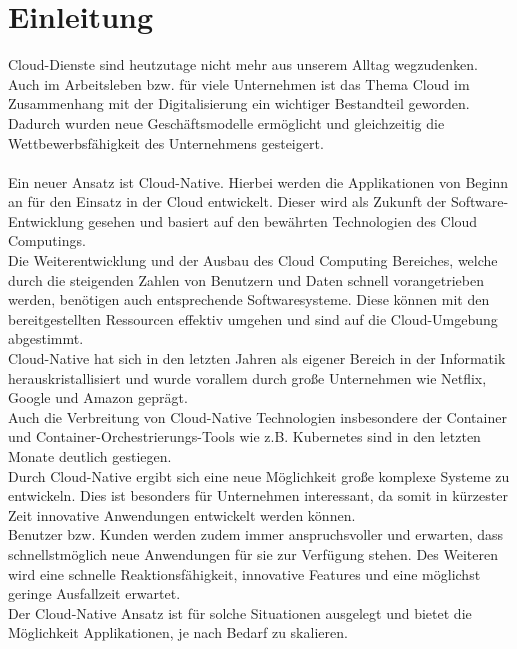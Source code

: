 \chapter{Einleitung}
Cloud-Dienste sind heutzutage nicht mehr aus unserem Alltag wegzudenken. Auch im Arbeitsleben bzw. für viele Unternehmen ist das Thema Cloud im Zusammenhang mit der Digitalisierung ein wichtiger Bestandteil geworden. Dadurch wurden neue Geschäftsmodelle ermöglicht und gleichzeitig die Wettbewerbsfähigkeit des Unternehmens gesteigert.\\
\\
Ein neuer Ansatz ist Cloud-Native. Hierbei werden die Applikationen von Beginn an für den Einsatz in der Cloud entwickelt. Dieser wird als Zukunft der Software-Entwicklung gesehen und basiert auf den bewährten Technologien des Cloud Computings.\\
Die Weiterentwicklung und der Ausbau des Cloud Computing Bereiches, welche durch die steigenden Zahlen von Benutzern und Daten schnell vorangetrieben werden, benötigen auch entsprechende Softwaresysteme. Diese können mit den bereitgestellten Ressourcen effektiv umgehen und sind auf die Cloud-Umgebung abgestimmt.\\
Cloud-Native hat sich in den letzten Jahren als eigener Bereich in der Informatik herauskristallisiert und wurde vorallem durch große Unternehmen wie Netflix, Google und Amazon geprägt.\\
Auch die Verbreitung von Cloud-Native Technologien insbesondere der Container und Container-Orchestrierungs-Tools wie z.B. Kubernetes sind in den letzten Monate deutlich gestiegen.\\
Durch Cloud-Native ergibt sich eine neue Möglichkeit große komplexe Systeme zu entwickeln. Dies ist besonders für Unternehmen interessant, da somit in kürzester Zeit innovative Anwendungen entwickelt werden können.\\
Benutzer bzw. Kunden werden zudem immer anspruchsvoller und erwarten, dass schnellstmöglich neue Anwendungen für sie zur Verfügung stehen. Des Weiteren wird eine schnelle Reaktionsfähigkeit, innovative Features und eine möglichst geringe Ausfallzeit erwartet.\\
Der Cloud-Native Ansatz ist für solche Situationen ausgelegt und bietet die Möglichkeit Applikationen, je nach Bedarf zu skalieren.\\
\\